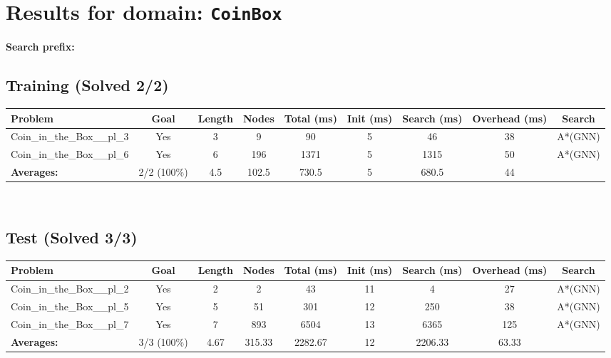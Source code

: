 \documentclass{article}
\begin{document}
\section*{Results for domain: \texttt{CoinBox}}
\textbf{Search prefix:} 
\\[0.5cm]
\subsection*{Training (Solved 2/2)}
\begin{tabular}{lcccccccc}
\toprule
Problem & Goal & Length & Nodes & Total (ms) & Init (ms) & Search (ms) & Overhead (ms) & Search \\
\midrule
Coin\_in\_the\_Box\_\_pl\_3 & Yes & 3 & 9 & 90 & 5 & 46 & 38 & A*(GNN) \\
Coin\_in\_the\_Box\_\_pl\_6 & Yes & 6 & 196 & 1371 & 5 & 1315 & 50 & A*(GNN) \\
\textbf{Averages:} & 2/2 (100\%) & 4.5 & 102.5 & 730.5 & 5 & 680.5 & 44 & \\
\bottomrule
\end{tabular}
\\[0.7cm]
\subsection*{Test (Solved 3/3)}
\begin{tabular}{lcccccccc}
\toprule
Problem & Goal & Length & Nodes & Total (ms) & Init (ms) & Search (ms) & Overhead (ms) & Search \\
\midrule
Coin\_in\_the\_Box\_\_pl\_2 & Yes & 2 & 2 & 43 & 11 & 4 & 27 & A*(GNN) \\
Coin\_in\_the\_Box\_\_pl\_5 & Yes & 5 & 51 & 301 & 12 & 250 & 38 & A*(GNN) \\
Coin\_in\_the\_Box\_\_pl\_7 & Yes & 7 & 893 & 6504 & 13 & 6365 & 125 & A*(GNN) \\
\textbf{Averages:} & 3/3 (100\%) & 4.67 & 315.33 & 2282.67 & 12 & 2206.33 & 63.33 & \\
\bottomrule
\end{tabular}
\\[0.7cm]
\end{document}
